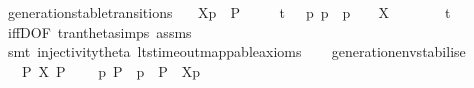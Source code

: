 \begin{isabellebody}
\endisatagproof
{\isafoldproof}%
%
\isadelimproof
\isanewline
%
\endisadelimproof
\isanewline
{}\isamarkupfalse%
\ generation{\isacharunderscore}{\kern0pt}stable{\isacharunderscore}{\kern0pt}transitions{\isacharcolon}{\kern0pt}\isanewline
\ \ \ {\isacartoucheopen}{\isasymtheta}{\isacharbrackleft}{\kern0pt}X{\isacharbrackright}{\kern0pt}{\isacharparenleft}{\kern0pt}p{\isacharparenright}{\kern0pt}\ {\isasymlongmapsto}\isactrlsup {\isasymtheta}{\isasymalpha}\ P{\isacharprime}{\kern0pt}{\isacartoucheclose}\isanewline
\ \ \ {\isacartoucheopen}{\isasymalpha}\ {\isacharequal}{\kern0pt}\ t{\isacharunderscore}{\kern0pt}{\isasymepsilon}\ {\isasymor}\ {\isacharparenleft}{\kern0pt}{\isasymexists}\ p{\isacharprime}{\kern0pt}{\isachardot}{\kern0pt}\ p\ {\isasymlongmapsto}{\isasymalpha}\ p{\isacharprime}{\kern0pt}\ {\isasymand}\ {\isacharparenleft}{\kern0pt}{\isasymalpha}\ {\isasymin}\ X\ {\isasymor}\ {\isasymalpha}\ {\isacharequal}{\kern0pt}\ {\isasymtau}\ {\isasymor}\ {\isasymalpha}\ {\isacharequal}{\kern0pt}\ t{\isacharparenright}{\kern0pt}{\isacharparenright}{\kern0pt}{\isacartoucheclose}\isanewline
%
\isadelimproof
\ \ %
\endisadelimproof
%
\isatagproof
{}\isamarkupfalse%
\ iffD{}{\isacharbrackleft}{\kern0pt}OF\ tran{\isacharunderscore}{\kern0pt}theta{\isachardot}{\kern0pt}simps\ assms{\isacharbrackright}{\kern0pt}\isanewline
\ \ \isamarkupfalse%
\ {\isacharparenleft}{\kern0pt}smt\ injectivity{\isacharunderscore}{\kern0pt}theta{\isacharparenleft}{\kern0pt}{}{\isacharcomma}{\kern0pt}{}{\isacharparenright}{\kern0pt}\ lts{\isacharunderscore}{\kern0pt}timeout{\isacharunderscore}{\kern0pt}mappable{\isacharunderscore}{\kern0pt}axioms{\isacharparenright}{\kern0pt}%
\endisatagproof
{\isafoldproof}%
%
\isadelimproof
\isanewline
%
\endisadelimproof
\ \ \isanewline
{}\isamarkupfalse%
\ generation{\isacharunderscore}{\kern0pt}env{\isacharunderscore}{\kern0pt}stabilise{\isacharcolon}{\kern0pt}\isanewline
\ \ \ {\isacartoucheopen}P\ {\isasymlongmapsto}\isactrlsup {\isasymtheta}{\isasymepsilon}{\isacharbrackleft}{\kern0pt}X{\isacharbrackright}{\kern0pt}\ P{\isacharprime}{\kern0pt}{\isacartoucheclose}\isanewline
\ \ \ {\isacartoucheopen}{\isasymexists}\ p{\isachardot}{\kern0pt}\ P\ {\isacharequal}{\kern0pt}\ {\isasymtheta}{\isacharparenleft}{\kern0pt}p{\isacharparenright}{\kern0pt}\ {\isasymand}\ P{\isacharprime}{\kern0pt}\ {\isacharequal}{\kern0pt}\ {\isasymtheta}{\isacharbrackleft}{\kern0pt}X{\isacharbrackright}{\kern0pt}{\isacharparenleft}{\kern0pt}p{\isacharparenright}{\kern0pt}{\isacartoucheclose}\ \isanewline

\end{isabellebody}
